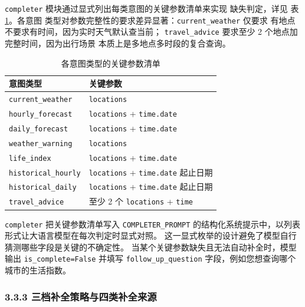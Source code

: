 \documentclass[a4paper]{article}
\newcommand{\song}{\CJKfamily{song}}
\theoremstyle{definition}
\theoremstyle{plain}
\theoremstyle{remark}
\newcommand{\reftab}[1]{表 \ref{#1}}
\newcommand{\bk}{\discretionary{}{}{}}
\begin{document}
\texttt{completer} 模块通过显式列出每类意图的关键参数清单来实现
缺失判定，详见 \reftab{tab:completion-required-params}。各意图
类型对参数完整性的要求差异显著：\texttt{current\_\bk{}weather} 仅要求
有地点不要求有时间，因为实时天气默认查当前；
\texttt{travel\_\bk{}advice} 要求至少 2 个地点加完整时间，因为出行场景
本质上是多地点多时段的复合查询。

\begin{table}[!ht]
    \centering
    \caption{各意图类型的关键参数清单}
    \label{tab:completion-required-params}
    \song\fontsize{9pt}{12pt}\selectfont
    \renewcommand{\arraystretch}{0.95}
    \begin{tabular}{ll}
        \toprule
        意图类型 & 关键参数 \\
        \midrule
        \texttt{current\_\bk{}weather} & \texttt{locations} \\
        \texttt{hourly\_\bk{}forecast} & \texttt{locations} + \texttt{time.\bk{}date} \\
        \texttt{daily\_\bk{}forecast} & \texttt{locations} + \texttt{time.\bk{}date} \\
        \texttt{weather\_\bk{}warning} & \texttt{locations} \\
        \texttt{life\_\bk{}index} & \texttt{locations} + \texttt{time.\bk{}date} \\
        \texttt{historical\_\bk{}hourly} & \texttt{locations} + \texttt{time.\bk{}date} 起止日期 \\
        \texttt{historical\_\bk{}daily} & \texttt{locations} + \texttt{time.\bk{}date} 起止日期 \\
        \texttt{travel\_\bk{}advice} & 至少 2 个 \texttt{locations} + \texttt{time} \\
        \bottomrule
    \end{tabular}
\end{table}

\texttt{completer} 把关键参数清单写入 \texttt{COMPLETER\_\bk{}PROMPT}
的结构化系统提示中，以列表形式让大语言模型在每次判定时显式对照。
这一显式枚举的设计避免了模型自行猜测哪些字段是关键的不确定性。
当某个关键参数缺失且无法自动补全时，模型输出
\texttt{is\_\bk{}complete=\bk{}False} 并填写 \texttt{follow\_\bk{}up\_\bk{}question}
字段，例如您想查询哪个城市的生活指数。

\subsubsection*{3.3.3 \quad 三档补全策略与四类补全来源}
\end{document}
